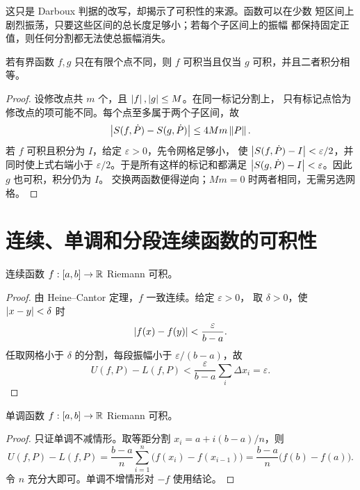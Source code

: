 这只是 Darboux 判据的改写，却揭示了可积性的来源。函数可以在少数
短区间上剧烈振荡，只要这些区间的总长度足够小；若每个子区间上的振幅
都保持固定正值，则任何分割都无法使总振幅消失。

\begin{proposition}[有限个点的修改]
\label{prop:riemann-finite-modification}
若有界函数 \(f,g\) 只在有限个点不同，则 \(f\) 可积当且仅当
\(g\) 可积，并且二者积分相等。
\end{proposition}

\begin{proof}
设修改点共 \(m\) 个，且 \(\left|f\right|,\left|g\right|\le M\)。在同一标记分割上，
只有标记点恰为修改点的项可能不同。每个点至多属于两个子区间，故
\[
 \left|S(f,\dot P)-S(g,\dot P)\right|\le4Mm\left\lVert P\right\rVert.
\]
若 \(f\) 可积且积分为 \(I\)，给定 \(\varepsilon>0\)，先令网格足够小，
使 \(\left|S(f,\dot P)-I\right|<\varepsilon/2\)，并同时使上式右端小于
\(\varepsilon/2\)。于是所有这样的标记和都满足
\(\left|S(g,\dot P)-I\right|<\varepsilon\)。因此 \(g\) 也可积，积分仍为 \(I\)。
交换两函数便得逆向；\(Mm=0\) 时两者相同，无需另选网格。
\end{proof}

\section{连续、单调和分段连续函数的可积性}

\begin{theorem}[连续函数可积]
\label{thm:continuous-riemann-integrable}
连续函数 \(f:[a,b]\to\mathbb{R}\) Riemann 可积。
\end{theorem}

\begin{proof}
由 Heine--Cantor 定理，\(f\) 一致连续。给定 \(\varepsilon>0\)，
取 \(\delta>0\)，使 \(\left|x-y\right|<\delta\) 时
\[
 \left|f(x)-f(y)\right|<\frac{\varepsilon}{b-a}.
\]
任取网格小于 \(\delta\) 的分割，每段振幅小于
\(\varepsilon/(b-a)\)，故
\[
 U(f,P)-L(f,P)
 <\frac{\varepsilon}{b-a}\sum_i\Delta x_i
 =\varepsilon.
\]
\end{proof}

\begin{theorem}[单调函数可积]
\label{thm:monotone-riemann-integrable}
单调函数 \(f:[a,b]\to\mathbb{R}\) Riemann 可积。
\end{theorem}

\begin{proof}
只证单调不减情形。取等距分割 \(x_i=a+i(b-a)/n\)，则
\[
 U(f,P)-L(f,P)
 =\frac{b-a}{n}\sum_{i=1}^n
   \bigl(f(x_i)-f(x_{i-1})\bigr)
 =\frac{b-a}{n}\bigl(f(b)-f(a)\bigr).
\]
令 \(n\) 充分大即可。单调不增情形对 \(-f\) 使用结论。
\end{proof}

